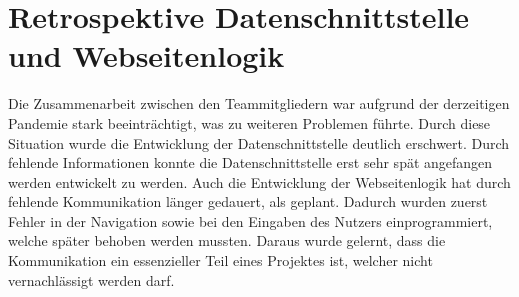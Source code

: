 \section{Retrospektive Datenschnittstelle und Webseitenlogik}
Die Zusammenarbeit zwischen den Teammitgliedern war aufgrund der derzeitigen Pandemie stark beeinträchtigt, was zu weiteren Problemen führte. Durch diese Situation wurde die Entwicklung der Datenschnittstelle deutlich erschwert. Durch fehlende Informationen konnte die Datenschnittstelle erst sehr spät angefangen werden entwickelt zu werden. Auch die Entwicklung der Webseitenlogik hat durch fehlende Kommunikation länger gedauert, als geplant. Dadurch wurden zuerst Fehler in der Navigation sowie bei den Eingaben des Nutzers einprogrammiert, welche später behoben werden mussten. Daraus wurde gelernt, dass die Kommunikation ein essenzieller Teil eines Projektes ist, welcher nicht vernachlässigt werden darf.